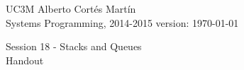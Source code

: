 \documentclass[a4paper, 10pt]{article}
\newcommand{\realtitle}{Session 18 - Stacks and Queues}
\begin{document}
\footnotesize{
\makebox[\linewidth]{\rule{\textwidth}{0.4pt}}
UC3M \hfill Alberto Cortés Martín\\
Systems Programming, 2014-2015 \hfill version: \today\\
\makebox[\linewidth]{\rule{\textwidth}{0.4pt}}
\begin{center}
  \small{\realtitle}\\Handout
\end{center}
\makebox[\linewidth]{\rule{\textwidth}{0.4pt}}
}
\vspace{1cm}

%
\end{document}
